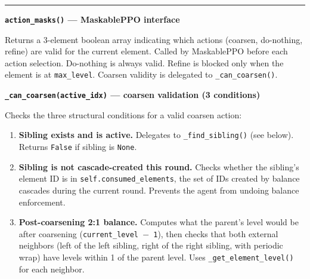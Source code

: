 \documentclass[11pt]{article}
\newcommand{\method}[1]{\textcolor{codeblue}{\texttt{#1}}}
\begin{document}
\vspace{0.5cm}
\begin{center}
\rule{0.6\textwidth}{0.4pt}
\end{center}
\vspace{0.3cm}

\noindent{\large\textbf{\textcolor{elementcolor}{Component 3: The Element Visit}}}

\vspace{0.3cm}

\noindent\textbf{\method{action\_masks()} \textnormal{--- MaskablePPO interface}}

\vspace{0.1cm}
\noindent Returns a 3-element boolean array indicating which actions (coarsen, do-nothing, refine) are valid for the current element. Called by MaskablePPO before each action selection. Do-nothing is always valid. Refine is blocked only when the element is at \texttt{max\_level}. Coarsen validity is delegated to \method{\_can\_coarsen()}.

\vspace{0.3cm}

\noindent\textbf{\method{\_can\_coarsen(active\_idx)} \textnormal{--- coarsen validation (3 conditions)}}

\vspace{0.1cm}
\noindent Checks the three structural conditions for a valid coarsen action:

\begin{enumerate}[leftmargin=1.5em, itemsep=3pt]
    \item \textbf{Sibling exists and is active.} Delegates to \method{\_find\_sibling()} (see below). Returns \texttt{False} if sibling is \texttt{None}.
    \item \textbf{Sibling is not cascade-created this round.} Checks whether the sibling's element ID is in \method{self.consumed\_elements}, the set of IDs created by balance cascades during the current round. Prevents the agent from undoing balance enforcement.
    \item \textbf{Post-coarsening 2:1 balance.} Computes what the parent's level would be after coarsening (\texttt{current\_level $-$ 1}), then checks that both external neighbors (left of the left sibling, right of the right sibling, with periodic wrap) have levels within 1 of the parent level. Uses \method{\_get\_element\_level()} for each neighbor.
\end{enumerate}
\end{document}
